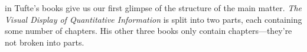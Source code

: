 \documentclass[a4paper,nofonts,notoc,oneside,openany,nobib]{tufte-book}
\newcommand{\VDQI}{\textit{The Visual Display of Quantitative Information}\xspace}
\newcommand{\BE}{\textit{Beautiful Evidence}\xspace}
\newcommand{\TL}{Tufte-\LaTeX\xspace}
\begin{document}
 in Tufte's books give us our first
glimpse of the structure of the main matter.  \VDQI is split into two
parts, each containing some number of chapters.  His other three books only
contain chapters---they're not broken into parts.







\end{document}
